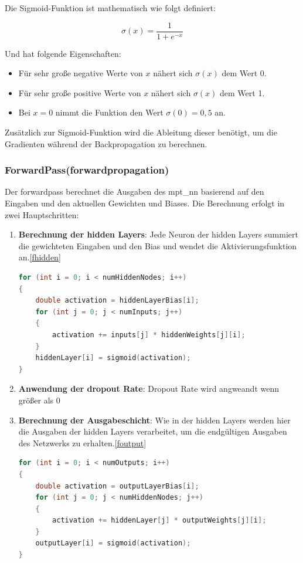\documentclass[a4paper, 12pt]{article}
\begin{document}
Die Sigmoid-Funktion ist mathematisch wie folgt definiert:

\[
\sigma(x) = \frac{1}{1 + e^{-x}}
\]

Und hat folgende Eigenschaften:

\begin{itemize}
    \item Für sehr große negative Werte von \( x \) nähert sich \( \sigma(x) \) dem Wert 0.
    \item Für sehr große positive Werte von \( x \) nähert sich \( \sigma(x) \) dem Wert 1.
    \item Bei \( x = 0 \) nimmt die Funktion den Wert \( \sigma(0) = 0{,}5 \) an.
\end{itemize}

Zusätzlich zur Sigmoid-Funktion wird die Ableitung dieser benötigt, um die Gradienten während der Backpropagation zu berechnen.

\subsubsection{ForwardPass(forwardpropagation)}

Der forwardpass berechnet die Ausgaben des mpt\_nn basierend auf den Eingaben und den aktuellen Gewichten und Biases. 
Die Berechnung erfolgt in zwei Hauptschritten:

\begin{enumerate}
    \item \textbf{Berechnung der hidden Layers}: Jede Neuron der hidden Layers summiert die gewichteten Eingaben und den Bias und wendet die Aktivierungsfunktion an.\ref{fhidden}
    \begin{lstlisting}[language=C, caption={forwardpass hidden}, label={fhidden}]
for (int i = 0; i < numHiddenNodes; i++)
{
    double activation = hiddenLayerBias[i];
    for (int j = 0; j < numInputs; j++)
    {
        activation += inputs[j] * hiddenWeights[j][i];
    }
    hiddenLayer[i] = sigmoid(activation);
}
    \end{lstlisting}
    \item \textbf{Anwendung der dropout Rate}: Dropout Rate wird angweandt wenn größer als 0
    \item \textbf{Berechnung der Ausgabeschicht}: Wie in der hidden Layers werden hier die Ausgaben der hidden Layers verarbeitet, um die endgültigen Ausgaben des Netzwerks zu erhalten.\ref{foutput}
    \begin{lstlisting}[language=C, caption={forwardpass output}, label={foutput}]
for (int i = 0; i < numOutputs; i++)
{
    double activation = outputLayerBias[i];
    for (int j = 0; j < numHiddenNodes; j++)
    {
        activation += hiddenLayer[j] * outputWeights[j][i];
    }
    outputLayer[i] = sigmoid(activation);
}
    \end{lstlisting}

\end{enumerate}
\end{document}
